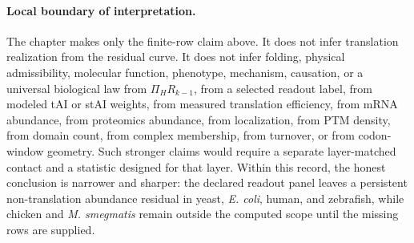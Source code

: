 \paragraph{Local boundary of interpretation.}
The chapter makes only the finite-row claim above.  It does not infer translation realization from the residual curve.  It does not infer folding, physical admissibility, molecular function, phenotype, mechanism, causation, or a universal biological law from $\Pi_H R_{k-1}$, from a selected readout label, from modeled tAI or stAI weights, from measured translation efficiency, from mRNA abundance, from proteomics abundance, from localization, from PTM density, from domain count, from complex membership, from turnover, or from codon-window geometry.  Such stronger claims would require a separate layer-matched contact and a statistic designed for that layer.  Within this record, the honest conclusion is narrower and sharper: the declared readout panel leaves a persistent non-translation abundance residual in yeast, \emph{E. coli}, human, and zebrafish, while chicken and \emph{M. smegmatis} remain outside the computed scope until the missing rows are supplied.
